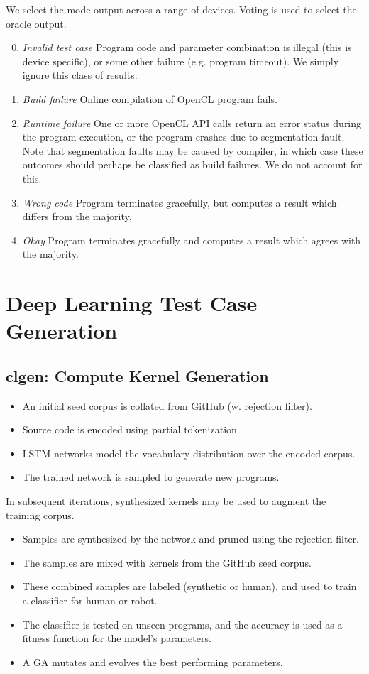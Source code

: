 We select the mode output across a range of devices. Voting is used to select the oracle output.
%
\begin{enumerate}
\setcounter{enumi}{-1}
\item \emph{Invalid test case} Program code and parameter combination is illegal (this is device specific), or some other failure (e.g. program timeout). We simply ignore this class of results.
\item \emph{Build failure} Online compilation of OpenCL program fails.
\item \emph{Runtime failure} One or more OpenCL API calls return an error status during the program execution, or the program crashes due to segmentation fault. Note that segmentation faults may be caused by compiler, in which case these outcomes should perhaps be classified as build failures. We do not account for this.
\item \emph{Wrong code} Program terminates gracefully, but computes a result which differs from the majority.
\item \emph{Okay} Program terminates gracefully and computes a result which agrees with the majority.
\end{enumerate}


\section{Deep Learning Test Case Generation}

\subsection{clgen: Compute Kernel Generation}

\begin{itemize}
\item An initial seed corpus is collated from GitHub (w. rejection filter).
\item Source code is encoded using partial tokenization.
\item LSTM networks model the vocabulary distribution over the encoded corpus.
\item The trained network is sampled to generate new programs.
\end{itemize}

In subsequent iterations, synthesized kernels may be used to augment the training corpus.

\begin{itemize}
\item Samples are synthesized by the network and pruned using the rejection filter.
\item The samples are mixed with kernels from the GitHub seed corpus.
\item These combined samples are labeled (synthetic or human), and used to train a classifier for human-or-robot.
\item The classifier is tested on unseen programs, and the accuracy is used as a fitness function for the model's parameters.
\item A GA mutates and evolves the best performing parameters.
\end{itemize}

